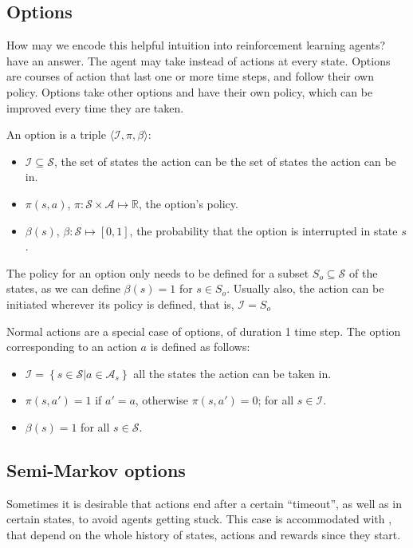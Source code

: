 \subsection{Options}

How may we encode this helpful intuition into reinforcement learning agents?
\citet{sutton1999between} have an answer. The agent may take
 instead of actions at every state. Options are courses of
action that last one or more time steps, and follow their own policy. Options take
other options and have their own policy, which can be improved every time they
are taken.

An option is a triple $\langle \mathcal{I}, \pi, \beta \rangle$:
\begin{itemize}
  \item $\mathcal{I} \subseteq \mathcal{S}$, the set of states the action can be
     the set of states the action can be
     in.
  \item $\pi(s, a)$, $\pi : \mathcal{S} \times \mathcal{A} \mapsto \mathbb{R}$,
the option's policy.
  \item $\beta(s)$, $\beta : \mathcal{S} \mapsto [0, 1]$, the probability that
the option is interrupted in state $s$.
\end{itemize}

The policy for an option only needs to be defined for a subset $S_o \subseteq
\mathcal{S}$ of the states, as we can define $\beta(s) = 1$ for $s \in S_o$.
Usually also, the action can be initiated wherever its policy is defined, that
is, $\mathcal{I} = S_o$

Normal actions are a special case of options, of duration 1 time step. The
option corresponding to an action $a$ is defined as follows:
\begin{itemize}
  \item $\mathcal{I} = \left\{ s \in \mathcal{S} | a \in \mathcal{A}_s \right\}$
  all the states the action can be taken in.
  \item $\pi(s, a') = 1$ if $a'=a$, otherwise $\pi(s, a') = 0$; for all
$s\in\mathcal{I}$.
  \item $\beta(s) = 1$ for all $s\in\mathcal{S}$.
\end{itemize}

\subsection{Semi-Markov options}
Sometimes it is desirable that actions end after a certain ``timeout'', as well
as in certain states, to avoid agents getting stuck. This case is accommodated
with , that depend on the whole history of
states, actions and rewards since they start.

